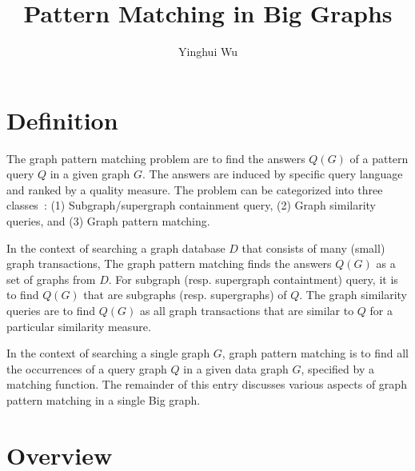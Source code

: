 \documentclass[graybox, natbib, nosecnum, twocolumn]{svmult}
\begin{document}
\title*{Pattern Matching in Big Graphs}
\author{Yinghui Wu}
%
%
\maketitle


\section{Definition}
The graph pattern matching problem are to find 
the answers $Q(G)$ of a pattern query $Q$ in a 
given graph $G$. The answers are induced by 
specific query language and 
ranked by a quality measure. 
The problem can be categorized into three classes~\citep{khan2017big}: 
(1) Subgraph/supergraph containment query, 
(2) Graph similarity queries, and
(3) Graph pattern matching. 

In the context of 
searching a graph database $D$ 
that consists of many (small) graph transactions,  
The graph pattern matching finds the answers $Q(G)$ 
as a set of graphs from $D$. 
For subgraph (resp. supergraph containtment) 
query, it is to find $Q(G)$ that are subgraphs (resp. supergraphs)
of $Q$. The graph similarity queries are to 
find $Q(G)$ as all graph transactions that are similar to 
$Q$ for a particular similarity measure. 

In the context of searching a single 
graph $G$, graph pattern matching is to 
find all the occurrences of a query graph $Q$ 
in a given data graph $G$, specified by a 
matching function. The remainder of this entry 
discusses various aspects of 
graph pattern matching in a single 
Big graph. 



\section{Overview}
\end{document}
